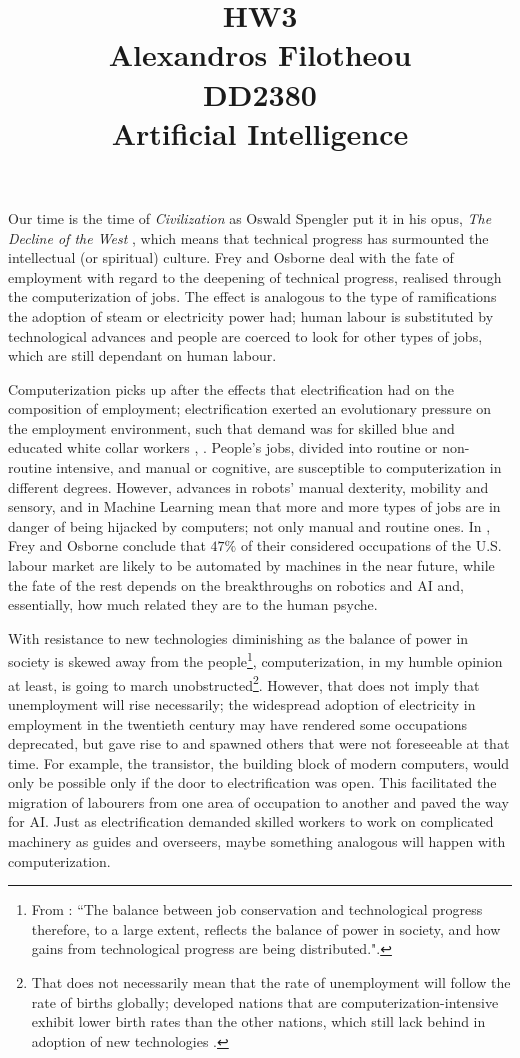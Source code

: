 \documentclass[12pt]{article}
\title{HW3 \\ Alexandros Filotheou \\ DD2380 \\ Artificial Intelligence}
\date{}
\begin{document}
  \maketitle
  
Our time is the time of \textit{Civilization} as Oswald Spengler put it in his opus, \textit{The Decline of the West} \cite{TDotW}, which means that technical progress has surmounted the intellectual (or spiritual) culture. Frey and Osborne \cite{TFoE} deal with the fate of employment with regard to the deepening of technical progress, realised through the computerization of jobs. The effect is analogous to the type of ramifications the adoption of steam or electricity power had; human labour is substituted by technological advances and people are coerced to look for other types of jobs, which are still dependant on human labour. 

Computerization picks up after the effects that electrification had on the composition of employment; electrification exerted an evolutionary pressure on the employment environment, such that demand was for skilled blue and educated white collar workers \cite{TOoTc}, \cite{Allen}. People's jobs, divided into routine or non-routine intensive, and manual or cognitive, are susceptible to computerization in different degrees. However, advances in robots' manual dexterity, mobility and sensory, and in Machine Learning mean that more and more types of jobs are in danger of being hijacked by computers; not only manual and routine ones. In \cite{TFoE}, Frey and Osborne conclude that $47\%$ of their considered occupations of the U.S. labour market are likely to be automated by machines in the near future, while the fate of the rest depends on the breakthroughs on robotics and AI and, essentially, how much related they are to the human psyche.

With resistance to new technologies diminishing as the balance of power in society is skewed away from the people\footnote{From \cite{TFoE}: ``The balance between job conservation and technological progress therefore, to a large extent, reflects the balance of power in society, and how gains from technological progress are being distributed.".}, computerization, in my humble opinion at least, is going to march unobstructed\footnote{That does not necessarily mean that the rate of unemployment will follow the rate of births globally; developed nations that are computerization-intensive exhibit lower birth rates than the other nations, which still lack behind in adoption of new technologies \cite{DCFR}.}. However, that does not imply that unemployment will rise necessarily; the widespread adoption of electricity in employment in the twentieth century may have rendered some occupations deprecated, but gave rise to and spawned others that were not foreseeable at that time. For example, the transistor, the building block of modern computers, would only be possible only if the door to electrification was open. This facilitated the migration of labourers from one area of occupation to another and paved the way for AI. Just as electrification demanded skilled workers to work on complicated machinery as guides and overseers, maybe something analogous will happen with computerization. 
\end{document}
